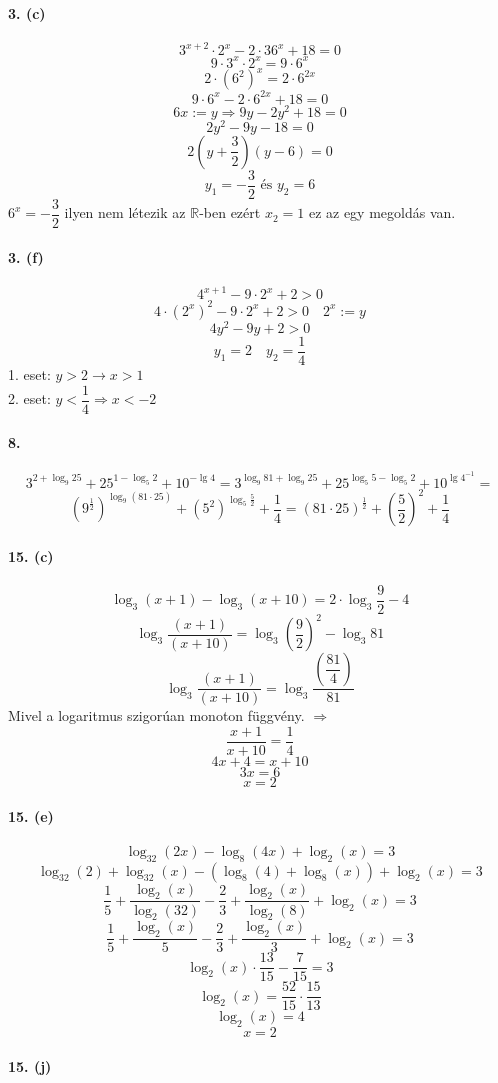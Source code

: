 \documentclass[12pt,a4paper,fleqn]{article}
\newcommand{\myparagraph}[1]{\paragraph{#1}\mbox{}}
\begin{document}
\myparagraph{3. (c)}
\[ 3^{x+2} \cdot 2^x - 2 \cdot 36^x + 18 = 0 \]
\[ 9 \cdot 3^x \cdot 2^x = 9 \cdot 6^x \]
\[ 2 \cdot (6^2)^x= 2 \cdot 6^{2x} \]
\[ 9 \cdot 6^x - 2 \cdot 6^{2x} + 18 = 0 \]
\[ 6x := y \Rightarrow 9y - 2y^2 + 18 = 0 \]
\[ 2y^2 - 9y - 18 = 0 \]
\[ 2(y+\dfrac{3}{2})(y-6) = 0 \]
\[ y_1=-\dfrac{3}{2} \text{ és } y_2 = 6 \]
$ 6^x = -\dfrac{3}{2}$ ilyen nem létezik az $\mathbb{R}$-ben ezért $ x_2 = 1 $
  ez az egy megoldás van.


\myparagraph{3. (f)}
\[ 4^{x+1} - 9 \cdot 2^x + 2 > 0 \]
\[ 4 \cdot (2^x)^2 - 9 \cdot 2^x + 2 > 0 \quad 2^x:=y\]
\[ 4y^2 - 9y + 2 > 0 \]
\[ y_1 = 2 \quad y_2 = \dfrac{1}{4} \]
1. eset: $y > 2 \rightarrow x > 1$ \\
2. eset: $y < \dfrac{1}{4} \Rightarrow x < -2 $


\myparagraph{8.}
\[ 3^{2+\log_9 25} + 25^{1-\log_5 2} + 10^{-\lg 4} = 3^{\log_9 81 + \log_9 25} +
  25^{\log_5 5 - \log_5 2} + 10^{\lg 4^{-1}} = \]
\[ \left(9^{\frac{1}{2}}\right)^{\log_9 (81 \cdot 25)} + \left(5^2\right)^{\log_5 \frac{5}{2}} +
  \dfrac{1}{4} = (81 \cdot 25)^{\frac{1}{2}} + \left(\dfrac{5}{2}\right)^2 + \dfrac{1}{4} \]

\myparagraph{15. (c)}
\[ \log_3 (x+1) - \log_3 (x+10) = 2 \cdot \log_3 \frac{9}{2} - 4 \]
\[ \log_3 \dfrac{(x+1)}{(x+10)} = \log_3 \left(\dfrac{9}{2}\right)^2 - \log_3 81 \]
\[ \log_3 \dfrac{(x+1)}{(x+10)} = \log_3 \dfrac{\left(\dfrac{81}{4}\right)}{81} \]
Mivel a logaritmus szigorúan monoton függvény. $\Longrightarrow$
\[ \dfrac{x+1}{x+10} = \dfrac{1}{4} \]
\[ 4x + 4 = x + 10 \]
\[ 3x = 6 \]
\[ x = 2 \]

\myparagraph{15. (e)}
\[ \log_{32} (2x) - \log_8 (4x) + \log_2 (x) = 3 \]
\[ \log_{32} (2) + \log_{32} (x) - (\log_8 (4) + \log_8 (x)) + \log_2 (x) = 3 \]
\[ \dfrac{1}{5} + \dfrac{\log_2 (x)}{\log_2 (32)} - \dfrac{2}{3} + \dfrac{\log_2 (x)}{\log_2 (8)} +
  \log_2 (x) = 3\]
\[ \dfrac{1}{5} + \dfrac{\log_2 (x)}{5} - \dfrac{2}{3} + \dfrac{\log_2 (x)}{3} + \log_2 (x) = 3 \]
\[ \log_2 (x) \cdot \dfrac{13}{15} - \dfrac{7}{15} = 3 \]
\[ \log_2 (x) = \dfrac{52}{15} \cdot \dfrac{15}{13} \]
\[ \log_2 (x) = 4 \]
\[ x = 2 \]

\clearpage
\myparagraph{15. (j)}
\end{document}
